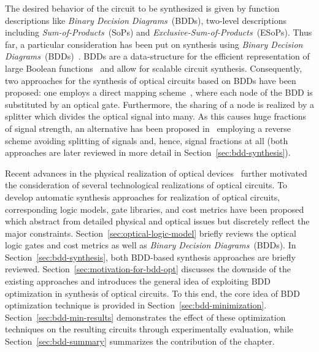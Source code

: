\documentclass[10pt,letterpaper,twoside,openright]{book}
\begin{document}
The desired behavior of the circuit to be synthesized is given by function descriptions like \emph{Binary Decision Diagrams}~(BDDs), two-level descriptions including \emph{Sum-of-Products}~(SoPs) and \emph{Exclusive-Sum-of-Products}~(ESoPs). Thus far, a particular consideration has been put on synthesis using \emph{Binary Decision Diagrams}~(BDDs)~\cite{Condrat2011,WKHD:2015}. BDDs are a data-structure for the efficient representation of large Boolean functions~\cite{Bryant1986} and allow for scalable circuit synthesis. Consequently, two approaches for the synthesis of optical circuits based on BDDs have been proposed: one employs a direct mapping scheme~\cite{Condrat2011}, where each node of the BDD is substituted by an optical gate. Furthermore, the sharing of a node is realized by a splitter which divides the optical signal into many. As this causes huge fractions of signal strength, an alternative has been proposed in~\cite{WKHD:2015} employing a reverse scheme avoiding splitting of signals and, hence, signal fractions at all (both approaches are later reviewed in more detail in Section~\ref{sec:bdd-synthesis}). 

Recent advances in the physical realization of optical devices~\cite{TODO} further motivated the consideration of several technological realizations of optical circuits. 
To develop automatic synthesis approaches for realization of optical circuits, corresponding logic models, gate libraries, and cost metrics have been proposed which abstract from detailed physical and optical issues but discretely reflect the major constraints.  
Section~\ref{sec:optical-logic-model} briefly reviews the optical logic gates and cost metrics as well as \emph{Binary Decision Diagrams}~(BDDs). In Section~\ref{sec:bdd-synthesis}, both BDD-based synthesis approaches are briefly reviewed. 
Section~\ref{sec:motivation-for-bdd-opt} discusses the downside of the existing approaches and introduces the general idea of exploiting BDD optimization in synthesis of optical circuits. To this end, the core idea of BDD optimization technique is provided in Section~\ref{sec:bdd-minimization}. Section~\ref{sec:bdd-min-results} demonstrates the effect of these optimization techniques on the resulting circuits through experimentally evaluation, while Section~\ref{sec:bdd-summary} summarizes the contribution of the chapter. 

\end{document}
